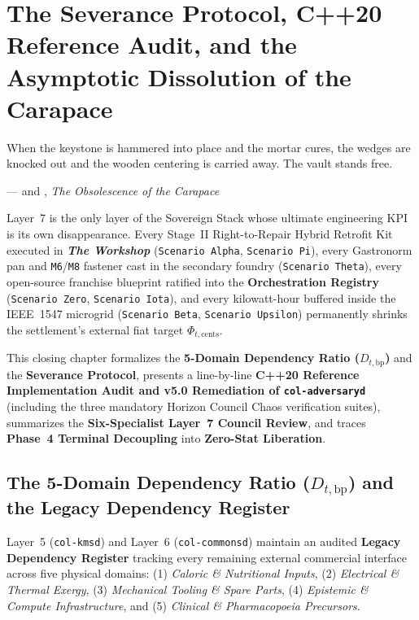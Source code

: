\chapter{The Severance Protocol, C++20 Reference Audit, and the Asymptotic Dissolution of the Carapace}
\label{ch:l7-the-inversion-point}

\epigraph{When the keystone is hammered into place and the mortar cures, the wedges are knocked out and the wooden centering is carried away. The vault stands free.}{---\textcite{illich1973} and \textcite{beer1974}, \textit{The Obsolescence of the Carapace}}

Layer~7 is the only layer of the Sovereign Stack whose ultimate engineering KPI is its own disappearance. Every Stage~II Right-to-Repair Hybrid Retrofit Kit executed in \textbf{\textit{The Workshop}} (\texttt{Scenario Alpha}, \texttt{Scenario Pi}), every Gastronorm pan and \texttt{M6}/\texttt{M8} fastener cast in the secondary foundry (\texttt{Scenario Theta}), every open-source franchise blueprint ratified into the \textbf{Orchestration Registry} (\texttt{Scenario Zero}, \texttt{Scenario Iota}), and every kilowatt-hour buffered inside the IEEE~1547 microgrid (\texttt{Scenario Beta}, \texttt{Scenario Upsilon}) permanently shrinks the settlement's external fiat target $\Phi_{t,\mathrm{cents}}$.

This closing chapter formalizes the \textbf{5-Domain Dependency Ratio ($D_{t,\mathrm{bp}}$)} and the \textbf{Severance Protocol}, presents a line-by-line \textbf{C++20 Reference Implementation Audit and v5.0 Remediation of \texttt{col-adversaryd}} (including the three mandatory Horizon Council Chaos verification suites), summarizes the \textbf{Six-Specialist Layer~7 Council Review}, and traces \textbf{Phase~4 Terminal Decoupling} into \textbf{Zero-Stat Liberation}.

\section{The 5-Domain Dependency Ratio ($D_{t,\mathrm{bp}}$) and the Legacy Dependency Register}
\label{sec:l7-dependency-ratio}

Layer~5 (\texttt{col-kmsd}) and Layer~6 (\texttt{col-commonsd}) maintain an audited \textbf{Legacy Dependency Register} tracking every remaining external commercial interface across five physical domains: (1) \textit{Caloric \& Nutritional Inputs}, (2) \textit{Electrical \& Thermal Exergy}, (3) \textit{Mechanical Tooling \& Spare Parts}, (4) \textit{Epistemic \& Compute Infrastructure}, and (5) \textit{Clinical \& Pharmacopoeia Precursors}.

